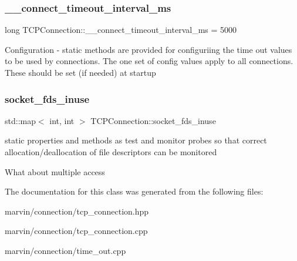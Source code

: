 \subsubsection{\texorpdfstring{\+\_\+\+\_\+connect\+\_\+timeout\+\_\+interval\+\_\+ms}{\_\_connect\_timeout\_interval\_ms}}
{\footnotesize\ttfamily long T\+C\+P\+Connection\+::\+\_\+\+\_\+connect\+\_\+timeout\+\_\+interval\+\_\+ms = 5000\hspace{0.3cm}{\ttfamily [static]}}

Configuration -\/ static methods are provided for configuriing the time out values to be used by connections. The one set of config values apply to all connections. These should be set (if needed) at startup \mbox{\label{class_t_c_p_connection_a257b53aea1460ce87ca0d5f269d1326f}} 
\subsubsection{\texorpdfstring{socket\+\_\+fds\+\_\+inuse}{socket\_fds\_inuse}}
{\footnotesize\ttfamily std\+::map$<$ int, int $>$ T\+C\+P\+Connection\+::socket\+\_\+fds\+\_\+inuse\hspace{0.3cm}{\ttfamily [static]}}

static properties and methods as test and monitor probes so that correct allocation/deallocation of file descriptors can be monitored

What about multiple access 

The documentation for this class was generated from the following files\+:\begin{DoxyCompactItemize}
\item 
marvin/connection/tcp\+\_\+connection.\+hpp\item 
marvin/connection/tcp\+\_\+connection.\+cpp\item 
marvin/connection/time\+\_\+out.\+cpp\end{DoxyCompactItemize}
